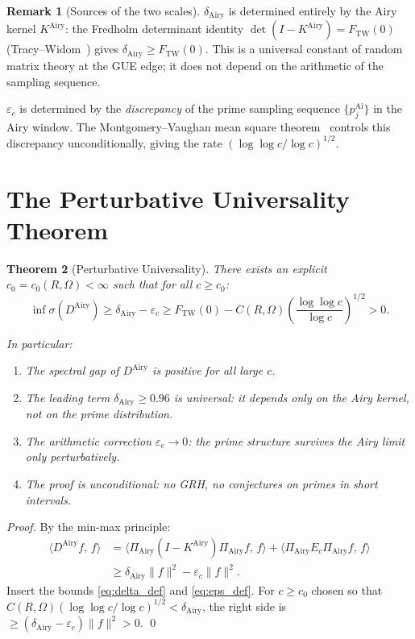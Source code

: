 \documentclass[12pt,a4paper]{amsart}
\newtheorem{theorem}{Theorem}[section]
\theoremstyle{definition}
\newtheorem{remark}[theorem]{Remark}
\newcommand{\KAi}{K^{\mathrm{Airy}}}
\newcommand{\DAi}{D^{\mathrm{Airy}}}
\newcommand{\PAi}{\Pi_{\mathrm{Airy}}}
\newcommand{\norm}[1]{\|#1\|}
\newcommand{\ip}[2]{\langle #1,\, #2\rangle}
\newcommand{\Ec}{E_c}
\begin{document}
\begin{remark}[Sources of the two scales]
$\delta_{\mathrm{Airy}}$ is determined entirely by the Airy kernel $\KAi$:
the Fredholm determinant identity $\det(I-\KAi) = F_{\mathrm{TW}}(0)$
(Tracy--Widom~\cite{TW1994}) gives $\delta_{\mathrm{Airy}} \ge F_{\mathrm{TW}}(0)$.
This is a universal constant of random matrix theory at the GUE edge;
it does not depend on the arithmetic of the sampling sequence.

$\varepsilon_c$ is determined by the \emph{discrepancy}
of the prime sampling sequence $\{p_j^{\mathrm{Ai}}\}$ in the Airy window.
The Montgomery--Vaughan mean square theorem~\cite{MV1974} controls
this discrepancy unconditionally, giving the rate $(\log\log c/\log c)^{1/2}$.
\end{remark}

\section{The Perturbative Universality Theorem}
\label{sec:theorem}

\begin{theorem}[Perturbative Universality]\label{thm:main}
There exists an explicit $c_0 = c_0(R,\Omega) < \infty$ such that
for all $c \ge c_0$:
\begin{equation}\label{eq:main}
  \inf\sigma(\DAi)
  \ge \delta_{\mathrm{Airy}} - \varepsilon_c
  \ge F_{\mathrm{TW}}(0) - C(R,\Omega)\left(\frac{\log\log c}{\log c}\right)^{1/2}
  > 0.
\end{equation}

In particular:
\begin{enumerate}[\rm (i)]
  \item The spectral gap of $\DAi$ is positive for all large $c$.
  \item The leading term $\delta_{\mathrm{Airy}} \ge 0.96$ is universal:
    it depends only on the Airy kernel, not on the prime distribution.
  \item The arithmetic correction $\varepsilon_c \to 0$:
    the prime structure survives the Airy limit only perturbatively.
  \item The proof is unconditional: no GRH, no conjectures on primes in
    short intervals.
\end{enumerate}
\end{theorem}

\begin{proof}
By the min-max principle:
\begin{align*}
  \ip{\DAi f}{f}
  &= \ip{\PAi(I-\KAi)\PAi f}{f} + \ip{\PAi \Ec \PAi f}{f}\\
  &\ge \delta_{\mathrm{Airy}} \norm{f}^2 - \varepsilon_c \norm{f}^2.
\end{align*}
Insert the bounds \eqref{eq:delta_def} and \eqref{eq:eps_def}.
For $c \ge c_0$ chosen so that $C(R,\Omega)(\log\log c/\log c)^{1/2} < \delta_{\mathrm{Airy}}$,
the right side is $\ge (\delta_{\mathrm{Airy}} - \varepsilon_c)\norm{f}^2 > 0$. \qed
\end{proof}
\end{document}
